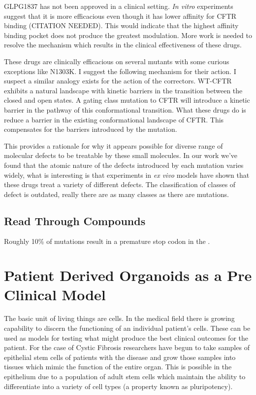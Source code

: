 GLPG1837 has not been approved in a clinical setting. \textit {In vitro} experiments suggest that it is more efficacious even though it has lower affinity for CFTR binding (CITATION NEEDED). This would indicate that the highest affinity binding pocket does not produce the greatest modulation. More work is needed to resolve the mechanism which results in the clinical effectiveness of these drugs.  

These drugs are clinically efficacious \cite{VanGoor2014} on several mutants with some curious exceptions like N1303K. I suggest the following mechanism for their action. I suspect a similar analogy exists for the action of the correctors. WT-CFTR exhibits a natural landscape with kinetic barriers in the transition between the closed and open states. A gating class mutation to CFTR will introduce a kinetic barrier in the pathway of this conformational transition. What these drugs do is reduce a barrier in the existing conformational landscape of CFTR. This compensates for the barriers introduced by the mutation. 

This provides a rationale for why it appears possible for diverse range of molecular defects to be treatable by these small molecules. In our work we've found that the atomic nature of the defects introduced by each mutation varies widely, what is interesting is that experiments in \textit{ex vivo} models have shown that these drugs treat a variety of different defects. The classification of classes of defect is outdated, really there are as many classes as there are mutations.

\subsection{Read Through Compounds}
Roughly 10\% of mutations result in a premature stop codon in the .

\section{Patient Derived Organoids as a Pre Clinical Model}
The basic unit of living things are cells. In the medical field there is growing capability to discern the functioning of an individual patient's cells. These can be used as models for testing what might produce the best clinical outcomes for the patient. For the case of Cystic Fibrosis researchers have begun to take samples of epithelial stem cells of patients with the disease and grow those samples into tissues which mimic the function of the entire organ\cite{depoel2020}. This is possible in the epithelium due to a population of adult stem cells which maintain the ability to differentiate into a variety of cell types (a property known as pluripotency). 

